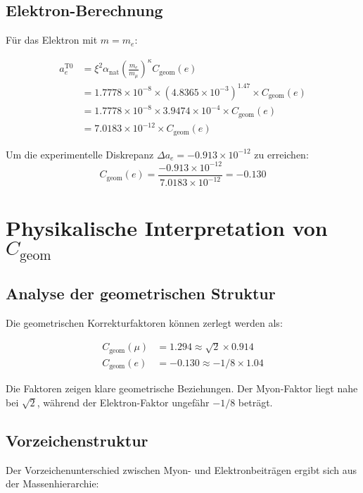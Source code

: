 \documentclass[12pt,a4paper]{article}
\newcommand{\xipar}{\xi}
\newcommand{\alphaNAT}{\alpha_{\text{nat}}}
\newcommand{\Cgeom}{C_{\text{geom}}}
\newcommand{\kappaT}{\kappa}
\newcommand{\mmu}{m_{\mu}}
\newcommand{\melec}{m_{e}}
\begin{document}
	\subsection{Elektron-Berechnung}
	
	Für das Elektron mit $m = \melec$:
	
	\begin{align}
		a_e^{\text{T0}} &= \xipar^2 \alphaNAT \left(\frac{\melec}{\mmu}\right)^{\kappaT} \Cgeom(e) \\
		&= 1.7778 \times 10^{-8} \times (4.8365 \times 10^{-3})^{1.47} \times \Cgeom(e) \\
		&= 1.7778 \times 10^{-8} \times 3.9474 \times 10^{-4} \times \Cgeom(e) \\
		&= 7.0183 \times 10^{-12} \times \Cgeom(e)
	\end{align}
	
	Um die experimentelle Diskrepanz $\Delta a_e = -0.913 \times 10^{-12}$ zu erreichen:
	\begin{equation}
		\Cgeom(e) = \frac{-0.913 \times 10^{-12}}{7.0183 \times 10^{-12}} = -0.130
	\end{equation}
	
	\section{Physikalische Interpretation von $\Cgeom$}
	
	\subsection{Analyse der geometrischen Struktur}
	
	Die geometrischen Korrekturfaktoren können zerlegt werden als:
	
	\begin{align}
		\Cgeom(\mu) &= 1.294 \approx \sqrt{2} \times 0.914 \\
		\Cgeom(e) &= -0.130 \approx -1/8 \times 1.04
	\end{align}
	
	Die Faktoren zeigen klare geometrische Beziehungen. Der Myon-Faktor liegt nahe bei $\sqrt{2}$, während der Elektron-Faktor ungefähr $-1/8$ beträgt.
	
	\subsection{Vorzeichenstruktur}
	
	Der Vorzeichenunterschied zwischen Myon- und Elektronbeiträgen ergibt sich aus der Massenhierarchie:
	
\end{document}
